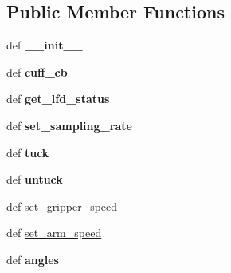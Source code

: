 \subsection*{Public Member Functions}
\begin{DoxyCompactItemize}
\item 
\hypertarget{classaml__robot_1_1baxter__robot_1_1_baxter_arm_a5bb32e202f6ca33616dfc1dbc4deacbd}{def {\bfseries \-\_\-\-\_\-init\-\_\-\-\_\-}}\label{classaml__robot_1_1baxter__robot_1_1_baxter_arm_a5bb32e202f6ca33616dfc1dbc4deacbd}

\item 
\hypertarget{classaml__robot_1_1baxter__robot_1_1_baxter_arm_a8cd539a9507523bd652a7910040a63dc}{def {\bfseries cuff\-\_\-cb}}\label{classaml__robot_1_1baxter__robot_1_1_baxter_arm_a8cd539a9507523bd652a7910040a63dc}

\item 
\hypertarget{classaml__robot_1_1baxter__robot_1_1_baxter_arm_a037ac0753c58df892cd013c19c4b9d4d}{def {\bfseries get\-\_\-lfd\-\_\-status}}\label{classaml__robot_1_1baxter__robot_1_1_baxter_arm_a037ac0753c58df892cd013c19c4b9d4d}

\item 
\hypertarget{classaml__robot_1_1baxter__robot_1_1_baxter_arm_acfc58bd9d71ab75dc3f4983683491f73}{def {\bfseries set\-\_\-sampling\-\_\-rate}}\label{classaml__robot_1_1baxter__robot_1_1_baxter_arm_acfc58bd9d71ab75dc3f4983683491f73}

\item 
\hypertarget{classaml__robot_1_1baxter__robot_1_1_baxter_arm_a4c8b2cb8474c9997a39ecdce549ad3ea}{def {\bfseries tuck}}\label{classaml__robot_1_1baxter__robot_1_1_baxter_arm_a4c8b2cb8474c9997a39ecdce549ad3ea}

\item 
\hypertarget{classaml__robot_1_1baxter__robot_1_1_baxter_arm_a9b91fe62bd9a397a300cccc09897af2a}{def {\bfseries untuck}}\label{classaml__robot_1_1baxter__robot_1_1_baxter_arm_a9b91fe62bd9a397a300cccc09897af2a}

\item 
def \hyperlink{classaml__robot_1_1baxter__robot_1_1_baxter_arm_a36fadfba465952cb96a7ea86f351e738}{set\-\_\-gripper\-\_\-speed}
\item 
def \hyperlink{classaml__robot_1_1baxter__robot_1_1_baxter_arm_abf9e91c6800d7e97c435d7283cdb792f}{set\-\_\-arm\-\_\-speed}
\item 
\hypertarget{classaml__robot_1_1baxter__robot_1_1_baxter_arm_a483af7e6b5671eac4d2f2e8f19694d9f}{def {\bfseries angles}}\label{classaml__robot_1_1baxter__robot_1_1_baxter_arm_a483af7e6b5671eac4d2f2e8f19694d9f}


\end{DoxyCompactItemize}
